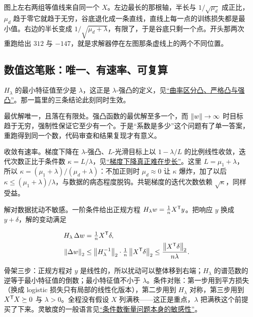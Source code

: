 图上左右两组等值线来自同一个 \(X\)。左边最长的那根轴，半长与 \(1/\sqrt{\mu_d}\) 成正比，\(\mu_d\) 趋于零它就趋于无穷，谷底退化成一条直线，直线上每一点的训练损失都是最小值。右边的半长变成 \(1/\sqrt{\mu_d+\lambda}\)，有限了，于是谷底只剩一个点。开头那两次重跑给出 \(312\) 与 \(-147\)，就是求解器停在左图那条虚线上的两个不同位置。

\subsection{数值这笔账：唯一、有速率、可复算}

\(H_\lambda\) 的最小特征值至少是 \(\lambda\)，这正是 \(\lambda\)-强凸的定义，见\hyperref[sec:09-Convex-Optimization/03-Convex-Functions/03]{``曲率区分凸、严格凸与强凸''}。那一篇里的三条结论此刻同时生效。

最优解唯一，且落在有限处。强凸函数的最优解至多一个，而 \(\left\lVert w\right\rVert\to\infty\) 时目标趋于无穷，强制性保证它至少有一个。于是``系数是多少''这个问题有了单一答案，重跑得到同一个数，代码审查和结果复现才有意义。

收敛有速率。梯度下降在 \(\lambda\)-强凸、\(L\)-光滑目标上以 \(1-\lambda/L\) 的比例线性收敛，迭代次数正比于条件数 \(\kappa=L/\lambda\)，见\hyperref[sec:09-Convex-Optimization/06-Optimization-Algorithms/01]{``梯度下降真正难在步长''}。这里 \(L=\mu_1+\lambda\)，所以 \(\kappa=(\mu_1+\lambda)/(\mu_d+\lambda)\)：不加正则时 \(\mu_d\approx0\) 让 \(\kappa\) 爆炸，加了以后 \(\kappa\le(\mu_1+\lambda)/\lambda\)，与数据的病态程度脱钩。共轭梯度的迭代次数依赖 \(\sqrt{\kappa}\)，同样受益。

解对数据扰动不敏感。一阶条件给出正规方程 \(H_\lambda w=\frac1nX^{\mathsf{T}}y\)。把响应 \(y\) 换成 \(y+\delta\)，解的变动满足

\[
\begin{aligned}
H_\lambda\,\Delta w&=\tfrac1nX^{\mathsf{T}}\delta,\\
\left\lVert\Delta w\right\rVert_2&\le\left\lVert H_\lambda^{-1}\right\rVert_2\cdot\tfrac1n\left\lVert X^{\mathsf{T}}\delta\right\rVert_2
\le\frac{\left\lVert X^{\mathsf{T}}\delta\right\rVert_2}{n\lambda}.
\end{aligned}
\]

骨架三步：正规方程对 \(y\) 是线性的，所以扰动可以整体移到右端；\(H_\lambda\) 的谱范数的逆等于最小特征值的倒数；最小特征值不小于 \(\lambda\)。条件对账：第一步用到平方损失（换成 logistic 损失只有局部的线性化版本），第二步用到 \(H_\lambda\) 对称，第三步用到 \(X^{\mathsf{T}}X\succeq0\) 与 \(\lambda>0\)。全程没有假设 \(X\) 列满秩——这正是重点，\(\lambda\) 把满秩这个前提买了下来。灵敏度的一般语言见\hyperref[sec:08-Numerical-Analysis/01-Floating-Point-and-Error/03]{``条件数衡量问题本身的敏感性''}。

